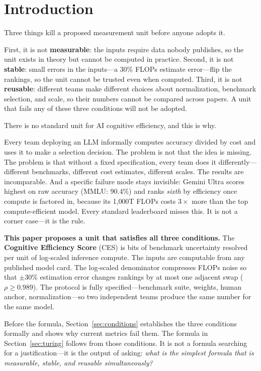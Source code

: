 \documentclass[12pt]{article}
\begin{document}
\section{Introduction}

Three things kill a proposed measurement unit before anyone adopts it.

First, it is not \textbf{measurable}: the inputs require data nobody publishes, so the unit
exists in theory but cannot be computed in practice. Second, it is not \textbf{stable}:
small errors in the inputs---a 30\% FLOPs estimate error---flip the rankings, so the unit
cannot be trusted even when computed. Third, it is not \textbf{reusable}: different teams
make different choices about normalization, benchmark selection, and scale, so their numbers
cannot be compared across papers. A unit that fails any of these three conditions will not
be adopted.

There is no standard unit for AI cognitive efficiency, and this is why.

Every team deploying an LLM informally computes accuracy divided by cost and uses it to
make a selection decision. The problem is not that the idea is missing. The problem is
that without a fixed specification, every team does it differently---different benchmarks,
different cost estimates, different scales. The results are incomparable. And a specific
failure mode stays invisible: Gemini Ultra scores highest on raw accuracy (MMLU: 90.4\%)
and ranks \textit{sixth} by efficiency once compute is factored in, because its 1{,}000T
FLOPs costs $3\times$ more than the top compute-efficient model. Every standard leaderboard
misses this. It is not a corner case---it is the rule.

\textbf{This paper proposes a unit that satisfies all three conditions.} The
\textbf{Cognitive Efficiency Score} (CES) is bits of benchmark uncertainty resolved per
unit of log-scaled inference compute. The inputs are computable from any published model
card. The log-scaled denominator compresses FLOPs noise so that $\pm30\%$ estimation error
changes rankings by at most one adjacent swap ($\rho \geq 0.989$). The protocol is fully
specified---benchmark suite, weights, human anchor, normalization---so two independent teams
produce the same number for the same model.

Before the formula, Section~\ref{sec:conditions} establishes the three conditions formally
and shows why current metrics fail them. The formula in Section~\ref{sec:turing} follows
from those conditions. It is not a formula searching for a justification---it is the output
of asking: \textit{what is the simplest formula that is measurable, stable, and reusable
simultaneously?}
\end{document}
